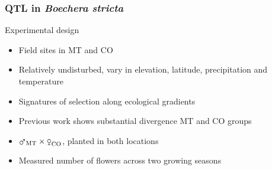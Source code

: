 \begin{frame}
\frametitle{QTL in \textit{Boechera stricta}}
\begin{block}{Experimental design}
\begin{itemize}
\item{Field sites in MT and CO}
\item{Relatively undisturbed, vary in elevation, latitude, precipitation and 
temperature}
\item{Signatures of selection along ecological gradients}
\item{Previous work shows substantial divergence MT and CO groups}
\item{$\text{\mars}_{\text{MT}} \times \text{\female}_{\text{CO}}$, planted in
both locations}
\item{Measured number of flowers across two growing seasons}
\end{itemize}
\end{block}
\tiny
\citet{Anderson:2012cb}
\end{frame}




